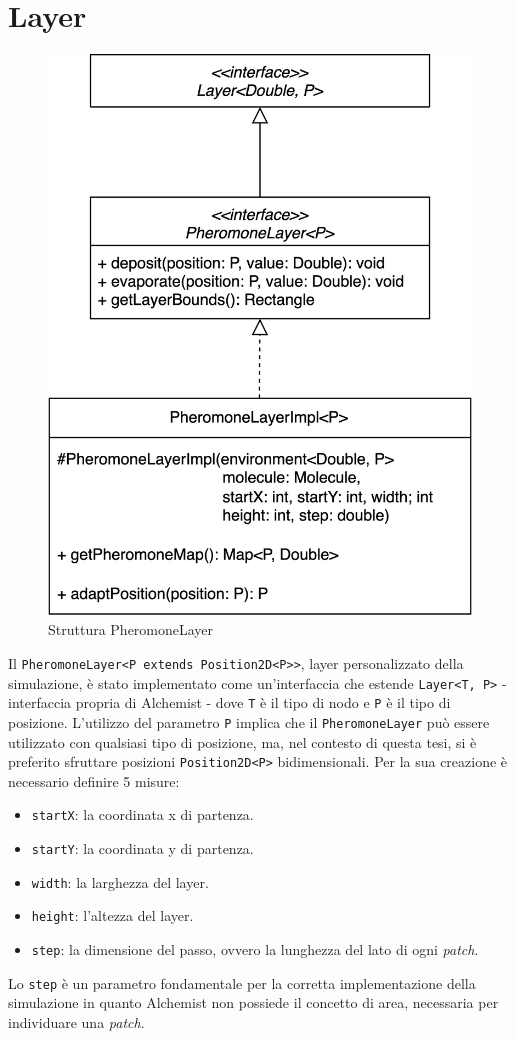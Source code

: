\section{Layer}\label{layer}
\begin{figure}[ht]
    \centering
    \includegraphics[width=.5\linewidth]{figures/pheromoneLayer.png}
    \caption{Struttura PheromoneLayer}\label{fig:phLayer}
\end{figure}
Il \texttt{PheromoneLayer<P extends Position2D<P>>}, layer personalizzato della simulazione, è stato implementato 
come un'interfaccia che estende \texttt{Layer<T, P>} - interfaccia propria di Alchemist -
dove \texttt{T} è il tipo di nodo e \texttt{P} è il tipo di posizione. 
L'utilizzo del parametro \texttt{P} implica che il \texttt{PheromoneLayer} può essere utilizzato con qualsiasi tipo di posizione, ma, nel contesto di questa tesi,
si è preferito sfruttare posizioni \texttt{Position2D<P>} bidimensionali.
Per la sua creazione è necessario definire 5 misure:
\begin{itemize}
    \item \texttt{startX}: la coordinata x di partenza.
    \item \texttt{startY}: la coordinata y di partenza.
    \item \texttt{width}: la larghezza del layer.
    \item \texttt{height}: l'altezza del layer.
    \item \texttt{step}: la dimensione del passo, ovvero la lunghezza del lato di ogni \textit{patch}.
\end{itemize}
Lo \texttt{step} è un parametro fondamentale per la corretta implementazione della simulazione
in quanto Alchemist non possiede il concetto di area, necessaria per individuare una \textit{patch}.
